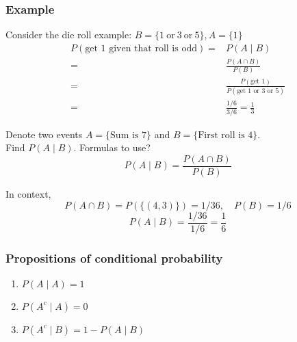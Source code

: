 \documentclass[slidestop,compress,mathserif]{beamer}
\begin{document}
\begin{frame}\frametitle{Example}
Consider the die roll example:  $B = \{1~\text{or}~3~\text{or}~5\}, A=\{1\}$
\begin{align*}
P(\text{get 1 given that roll is odd}) =& P(A \mid B)\\
= & \frac{P(A\cap B)}{P(B)} \\
=& \frac{P(\text{get 1})}{P(\text{get 1 or 3 or 5})} \\
=& \frac{1/6}{3/6}=\frac{1}{3}
\end{align*}
\end{frame}


\begin{frame}
\pause
Denote two events $A=\{\text{Sum is 7}\}$ and $B=\{\text{First roll is 4}\}$.\\
Find $P(A \mid B)$.
Formulas to use?
\[P(A\mid B)=\frac{P(A\cap B)}{P(B)}\]

\pause In context,
\[
P(A \cap B) = P\left(\{(4, 3)\}\right) = 1/36, \quad P(B) = 1/6
\]
\[
P(A \mid B) = \frac{1/36}{1/6} = \frac{1}{6}
\]

\end{frame}



\begin{frame}\frametitle{Propositions of conditional probability}

\begin{enumerate}
\item $P(A \mid A) = 1$ \pause
\vspace{1.5cm}
\item $P(A^c \mid A) = 0$ \pause
\vspace{1.5cm}
\item $P(A^c \mid B) = 1 - P(A \mid B)$
\vspace{1.5cm}
\end{enumerate}


\end{frame}
\end{document}
